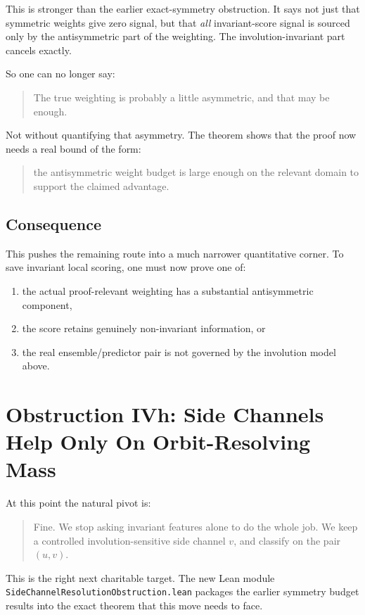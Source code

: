 \documentclass[11pt]{article}
\theoremstyle{remark}
\begin{document}
This is stronger than the earlier exact-symmetry obstruction.  It says not just that symmetric
weights give zero signal, but that \emph{all} invariant-score signal is sourced only by the
antisymmetric part of the weighting.  The involution-invariant part cancels exactly.

So one can no longer say:
\begin{quote}
The true weighting is probably a little asymmetric, and that may be enough.
\end{quote}

Not without quantifying that asymmetry.  The theorem shows that the proof now needs a real bound of
the form:
\begin{quote}
the antisymmetric weight budget is large enough on the relevant domain to support the claimed
advantage.
\end{quote}

\subsection{Consequence}

This pushes the remaining route into a much narrower quantitative corner.  To save invariant local
scoring, one must now prove one of:
\begin{enumerate}[leftmargin=1.5em]
  \item the actual proof-relevant weighting has a substantial antisymmetric component,
  \item the score retains genuinely non-invariant information, or
  \item the real ensemble/predictor pair is not governed by the involution model above.
\end{enumerate}

\section{Obstruction IVh: Side Channels Help Only On Orbit-Resolving Mass}

At this point the natural pivot is:
\begin{quote}
Fine.  We stop asking invariant features alone to do the whole job.  We keep a controlled
involution-sensitive side channel \(v\), and classify on the pair \((u,v)\).
\end{quote}

This is the right next charitable target.  The new Lean module
\texttt{SideChannelResolutionObstruction.lean} packages the earlier symmetry budget results into the
exact theorem that this move needs to face.
\end{document}
